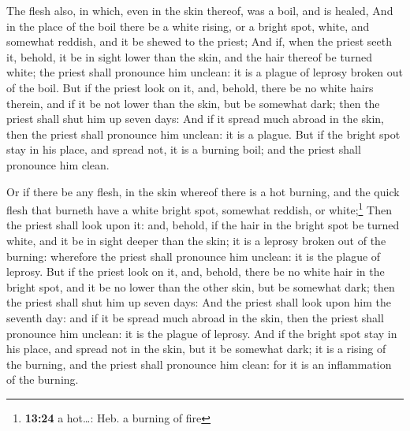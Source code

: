  The flesh also, in which, even in the skin thereof, was
a boil, and is healed,  And in the place of the boil
there be a white rising, or a bright spot, white, and somewhat reddish,
and it be shewed to the priest;  And if, when the priest
seeth it, behold, it be in sight lower than the skin, and the hair
thereof be turned white; the priest shall pronounce him unclean: it is a
plague of leprosy broken out of the boil.  But if the
priest look on it, and, behold, there be no white hairs therein, and if
it be not lower than the skin, but be somewhat dark; then the priest
shall shut him up seven days:  And if it spread much
abroad in the skin, then the priest shall pronounce him unclean: it is a
plague.  But if the bright spot stay in his place, and
spread not, it is a burning boil; and the priest shall pronounce him
clean.

 Or if there be any flesh, in the skin whereof there is a
hot burning, and the quick flesh that burneth have a white bright spot,
somewhat reddish, or white;\footnote{\textbf{13:24} a hot\ldots: Heb. a
  burning of fire}  Then the priest shall look upon it:
and, behold, if the hair in the bright spot be turned white, and it be
in sight deeper than the skin; it is a leprosy broken out of the
burning: wherefore the priest shall pronounce him unclean: it is the
plague of leprosy.  But if the priest look on it, and,
behold, there be no white hair in the bright spot, and it be no lower
than the other skin, but be somewhat dark; then the priest shall shut
him up seven days:  And the priest shall look upon him
the seventh day: and if it be spread much abroad in the skin, then the
priest shall pronounce him unclean: it is the plague of leprosy.
 And if the bright spot stay in his place, and spread not
in the skin, but it be somewhat dark; it is a rising of the burning, and
the priest shall pronounce him clean: for it is an inflammation of the
burning.

